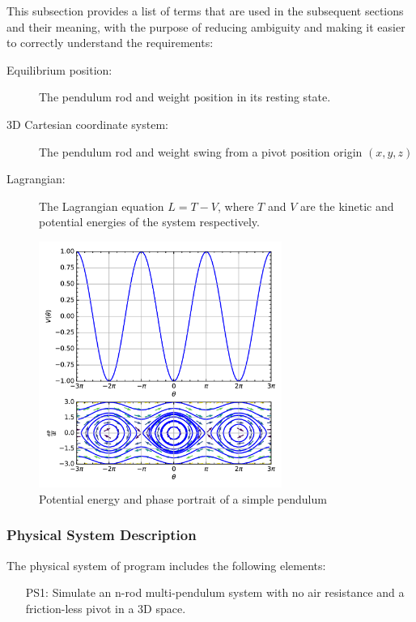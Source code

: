 \documentclass[12pt]{article}
\begin{document}
This subsection provides a list of terms that are used in the subsequent
sections and their meaning, with the purpose of reducing ambiguity and making
it easier to correctly understand the requirements:

\begin{description}
\item[Equilibrium position:] The pendulum rod and weight position in its 
resting state.
\item[3D Cartesian coordinate system:] The pendulum rod and weight swing from a
pivot position origin $(x,y,z)$
\end{description}

\begin{description}
\item[Lagrangian:] The Lagrangian equation $L=T-V$, where $T$ and $V$ are 
the kinetic and potential energies of the system respectively.
\end{description}

\begin{figure}[H]
	\centering
	\includegraphics[width=300px]{Pendulum_phase_PE.png}
	\caption{Potential energy and phase portrait of a simple 
	pendulum~\citep{WikipediaPendulum}}
	\label{fig:PE-pend}
\end{figure}

\subsubsection{Physical System Description}

The physical system of \progname program includes the following elements:

\begin{itemize}
\item[PS1:] Simulate an n-rod multi-pendulum system with no air
resistance and a friction-less pivot in a 3D space.
\end{itemize}
\end{document}
